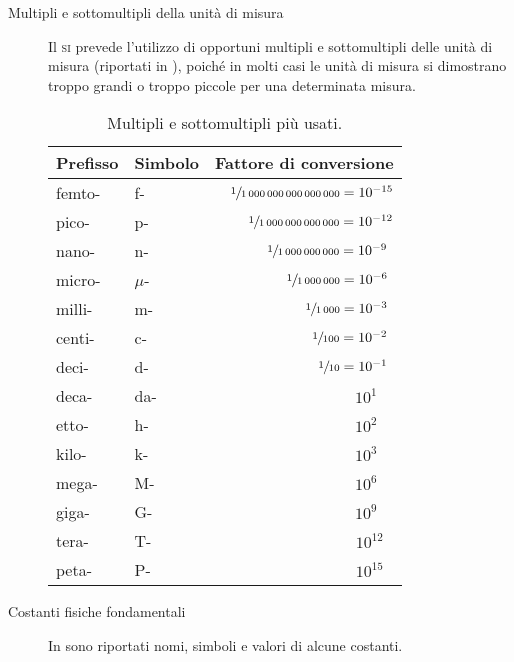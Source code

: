 \documentclass[a4paper,11pt,italian]{article}
\begin{document}
\begin{description}
  \item[Multipli e sottomultipli della unità di misura] %
  Il \textsc{si} prevede l'utilizzo di opportuni multipli e sottomultipli delle unità di misura (riportati in ), poiché in molti casi le unità di misura si dimostrano troppo grandi o troppo piccole per una determinata misura.
  \begin{table}[htp]\centering
    \begin{tabular}{llr}\toprule
      \textbf{Prefisso} & \textbf{Simbolo} & \textbf{Fattore di conversione} \\\midrule
      femto- & f- & $ \sfrac{1}{1\,000\,000\,000\,000\,000} = 10^{-15} $\\\addlinespace[.2em]
      pico- & p- & $ \sfrac{1}{1\,000\,000\,000\,000} = 10^{-12} $\\\addlinespace[.2em]
      nano- & n- & $ \sfrac{1}{1\,000\,000\,000} = 10^{-9} \:\, $\\\addlinespace[.2em]
      micro- & $ \mu $- & $ \sfrac{1}{1\,000\,000} = 10^{-6} \:\, $\\\addlinespace[.2em]
      milli- & m- & $ \sfrac{1}{1\,000} = 10^{-3} \:\, $\\\addlinespace[.2em]
      centi- & c- & $ \sfrac{1}{100} = 10^{-2} \:\, $\\\addlinespace[.2em]
      deci- & d- & $ \sfrac{1}{10} = 10^{-1} \:\, $\\\addlinespace[.2em]
      deca- & da- & $ 10^{1} \;\;\;\, $\\\addlinespace[.2em]
      etto- & h- & $ 10^{2} \;\;\;\, $\\\addlinespace[.2em]
      kilo- & k- & $ 10^{3} \;\;\;\, $\\\addlinespace[.2em]
      mega- & M- & $ 10^{6} \;\;\;\, $\\\addlinespace[.2em]
      giga- & G- & $ 10^{9} \;\;\;\, $\\\addlinespace[.2em]
      tera- & T- & $ 10^{12} \:\:\, $\\\addlinespace[.2em]
      peta- & P- & $ 10^{15} \:\:\, $\\\bottomrule
    \end{tabular}
  \caption{Multipli e sottomultipli più usati.}
    \label{tab:multipliesottomultipli}
  \end{table}
  
  \item[Costanti fisiche fondamentali] In  sono riportati nomi, simboli e valori di alcune costanti.
  

\end{description}
\end{document}
